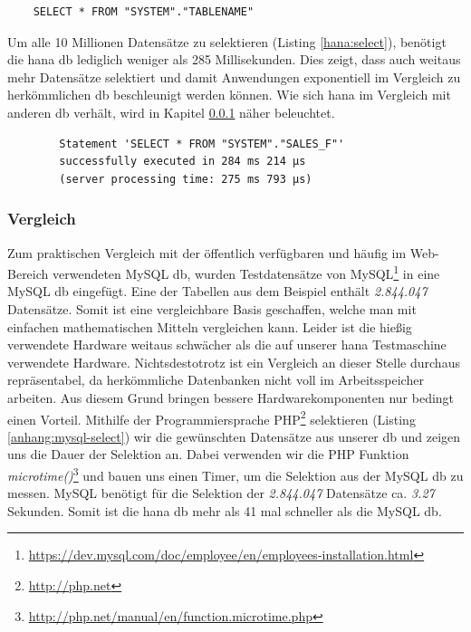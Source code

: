 \begin{lstlisting}
	SELECT * FROM "SYSTEM"."TABLENAME"
\end{lstlisting}

Um alle 10 Millionen Datensätze zu selektieren (Listing \ref{hana:select}), benötigt die \gls{hana} \gls{db} lediglich weniger als 285 Millisekunden. Dies zeigt, dass auch weitaus mehr Datensätze selektiert und damit Anwendungen exponentiell im Vergleich zu herkömmlichen \gls{db} beschleunigt werden können. Wie sich \gls{hana} im Vergleich mit anderen \gls{db} verhält, wird in Kapitel \ref{sec:db-hana-vgl} näher beleuchtet.

\begin{center}
	\begin{verbatim}
		Statement 'SELECT * FROM "SYSTEM"."SALES_F"' 
		successfully executed in 284 ms 214 µs  
		(server processing time: 275 ms 793 µs)
	\end{verbatim}
\end{center}

\subsubsection{Vergleich}
\label{sec:db-hana-vgl}
Zum praktischen Vergleich mit der öffentlich verfügbaren und häufig im Web-Bereich verwendeten MySQL \gls{db}, wurden Testdatensätze von MySQL\footnote{\url{https://dev.mysql.com/doc/employee/en/employees-installation.html}} in eine MySQL \gls{db} eingefügt. Eine der Tabellen aus dem Beispiel enthält \emph{2.844.047} Datensätze. Somit ist eine vergleichbare Basis geschaffen, welche man mit einfachen mathematischen Mitteln vergleichen kann. Leider ist die hießig verwendete Hardware weitaus schwächer als die auf unserer \gls{hana} Testmaschine verwendete Hardware. Nichtsdestotrotz ist ein Vergleich an dieser Stelle durchaus repräsentabel, da herkömmliche Datenbanken nicht voll im Arbeitsspeicher arbeiten. Aus diesem Grund bringen bessere Hardwarekomponenten nur bedingt einen Vorteil.
Mithilfe der Programmiersprache PHP\footnote{\url{http://php.net}} selektieren (Listing \ref{anhang:mysql-select}) wir die gewünschten Datensätze aus unserer \gls{db} und zeigen uns die Dauer der Selektion an. Dabei verwenden wir die PHP Funktion \emph{microtime()}\footnote{\url{http://php.net/manual/en/function.microtime.php}} und bauen uns einen Timer, um die Selektion aus der MySQL \gls{db} zu messen.
MySQL benötigt für die Selektion der \emph{2.844.047} Datensätze ca. \emph{3.27} Sekunden. Somit ist die \gls{hana} \gls{db} mehr als 41 mal schneller als die MySQL \gls{db}. 

